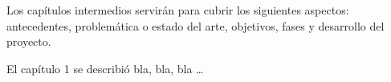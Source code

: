Los capítulos intermedios servirán para cubrir los siguientes aspectos: antecedentes, problemática o estado del arte, objetivos, fases y desarrollo del proyecto.

\bigskip
El capítulo 1 se describió bla, bla, bla …